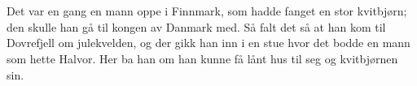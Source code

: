 \chapter*{\norwegianabstractname}
%
Det var en gang en mann oppe i Finnmark, som hadde fanget en stor kvitbjørn; den skulle han gå til kongen av Danmark med. Så falt det så at han kom til Dovrefjell om julekvelden, og der gikk han inn i en stue hvor det bodde en mann som hette Halvor. Her ba han om han kunne få lånt hus til seg og kvitbjørnen sin.
%
\clearpage
